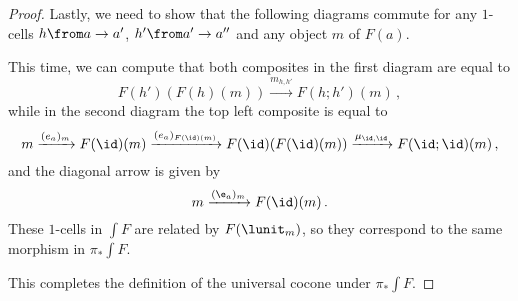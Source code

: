 \begin{proof}
  Lastly, we need to show that the following diagrams commute for any $1$-cells $h\from a \to a'$, $h'\from a' \to a''$ and any object $m$ of $F(a)$.
  This time, we can compute that both composites in the first diagram are equal to
  \[
    F(h')(F(h)(m)) \xrightarrow{m_{h,h'}} F(h;h')(m)\,,
    \]
  while in the second diagram the top left composite is equal to
  \[
    m \xrightarrow{(e_a)_m}
    F(\id)(m) \xrightarrow{(e_a)_{F(\id)(m)}}
    F(\id)(F(\id)(m)) \xrightarrow{\mu_{\id,\id}}
    F(\id;\id)(m)\,,
    \]
  and the diagonal arrow is given by
  \[
    m \xrightarrow{(\e_a)_m}
    F(\id)(m)\,.
    \]
  These $1$-cells in $\int F$ are related by $F(\lunit_m)$, so they correspond to the same morphism in $\pi_*\int F$.

  This completes the definition of the universal cocone under $\pi_*\int F$.


\end{proof}
